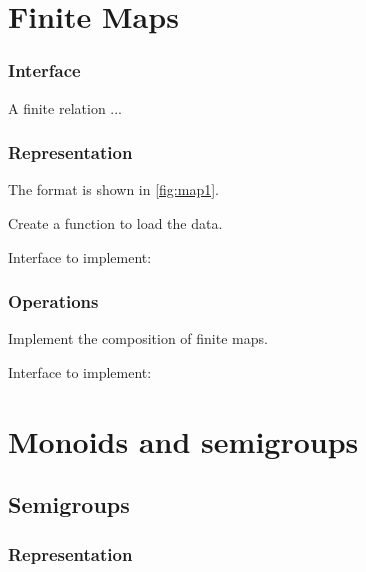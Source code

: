 \chapter{Finite Maps}

\subsection{Interface}

A finite relation  ...


\subsection{Representation}

The format is shown in \cref{fig:map1}.


\begin{exercise}[Representation]
  Create a function to load the data.

  Interface to implement:
%

\end{exercise}


\subsection{Operations}


\begin{exercise}[Composition]
  Implement the composition of finite maps.

  Interface to implement:
%

\end{exercise}





\chapter{Monoids and semigroups}



\section{Semigroups}


\subsection{Representation}

